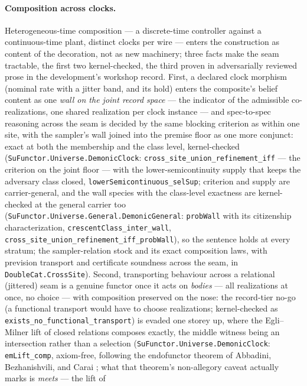 \paragraph{Composition across clocks.} Heterogeneous-time
composition --- a discrete-time controller against a
continuous-time plant, distinct clocks per wire --- enters the
construction as content of the decoration, not as new machinery; three
facts make the seam tractable, the first two kernel-checked, the
third proven in adversarially reviewed prose in the development's
workshop record. First, a declared clock
morphism (nominal rate with a jitter band, and its hold) enters the
composite's belief content as one \emph{wall on the joint record
space} --- the indicator of the admissible co-realizations, one
shared realization per clock instance --- and spec-to-spec
reasoning across the seam is decided by the same blocking criterion
as within one site, with the sampler's wall joined into the premise
floor as one more conjunct: exact at both the membership and the
class level, kernel-checked
(\texttt{SuFunctor.Universe.DemonicClock}:
\texttt{cross\_site\_union\_refinement\_iff} --- the criterion on
the joint floor --- with the lower-semicontinuity supply that keeps
the adversary class closed, \texttt{lowerSemicontinuous\_selSup};
criterion and supply are carrier-general, and the wall species with
the class-level exactness are kernel-checked at the general carrier
too (\texttt{SuFunctor.Universe.General.DemonicGeneral}:
\texttt{probWall} with its citizenship
characterization, \texttt{crescentClass\_inter\_wall},
\texttt{cross\_site\_union\_refinement\_iff\_probWall}), so the
sentence holds at every stratum; the sampler-relation stock and its
exact composition laws, with
prevision transport and certificate soundness across the seam, in
\texttt{DoubleCat.CrossSite}). Second, transporting behaviour across
a relational (jittered) seam is a genuine functor once it acts on
\emph{bodies} --- all realizations at once, no choice --- with
composition preserved on the nose: the record-tier no-go (a
functional transport would have to choose realizations;
kernel-checked as \texttt{exists\_no\_functional\_transport})
is evaded one storey up, where the Egli--Milner lift of closed
relations composes exactly, the middle witness being an
intersection rather than a selection
(\texttt{SuFunctor.Universe.DemonicClock}: \texttt{emLift\_comp},
axiom-free, following the endofunctor theorem of Abbadini,
Bezhanishvili, and Carai \cite{abbadini23}; what that theorem's
non-allegory caveat actually marks is \emph{meets} --- the lift of
